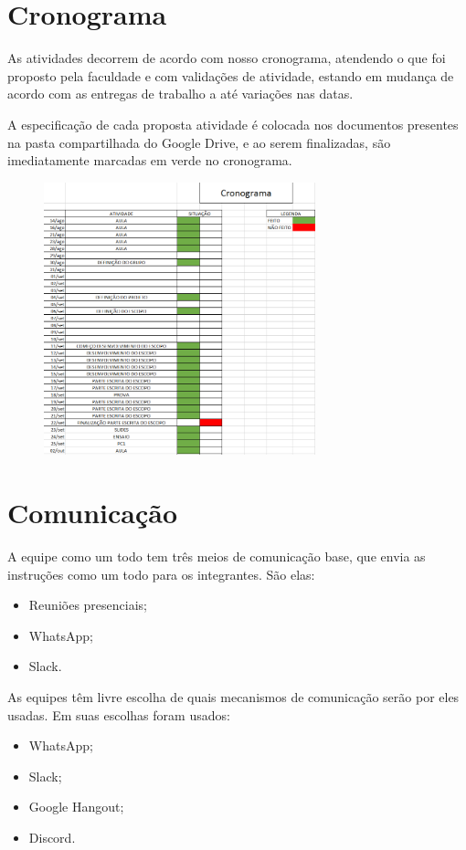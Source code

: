\section{Cronograma}
\par As atividades decorrem de acordo com nosso cronograma, atendendo o que foi proposto pela faculdade  e com validações de atividade, estando em mudança de acordo com as entregas de trabalho a até variações nas datas.
\par A especificação de cada proposta atividade é colocada nos documentos presentes na pasta compartilhada do Google Drive, e ao serem finalizadas, são imediatamente marcadas em verde no cronograma.

\begin{figure}[ht]
\center
\includegraphics[width=0.7\textwidth]{figuras/cronograma}
\end{figure}

\newpage

\section{Comunicação}
\par A equipe como um todo tem três meios de comunicação base, que envia as instruções como um todo para os integrantes. São elas:
\begin{itemize}
    \item Reuniões presenciais;
    \item WhatsApp;
    \item Slack.
\end{itemize}
\par As equipes têm livre escolha de quais mecanismos de comunicação serão por eles usadas. Em suas escolhas foram usados:
\begin{itemize}
    \item WhatsApp;
    \item Slack;
    \item Google Hangout;
    \item Discord.
\end{itemize}
